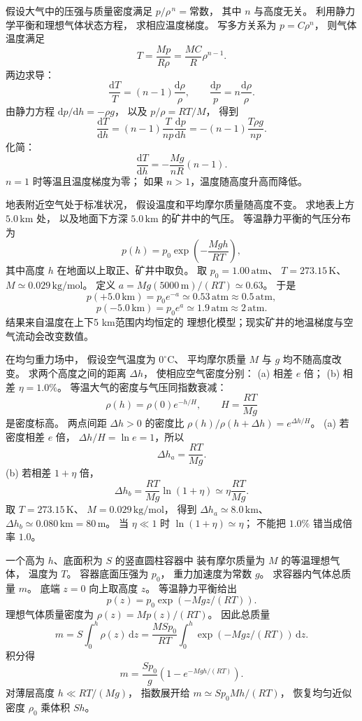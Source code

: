 假设大气中的压强与质量密度满足
$p/\rho^{\,n}=\text{常数}$，
其中 $n$ 与高度无关。
利用静力学平衡和理想气体状态方程，
求相应温度梯度。
\exsolution
写多方关系为 $p=C\rho^n$，
则气体温度满足
\[
T=\frac{Mp}{R\rho}
=\frac{MC}{R}\rho^{n-1}.
\]
两边求导：
\[
\frac{\mathrm dT}{T}
=(n-1)\frac{\mathrm d\rho}{\rho},
\qquad
\frac{\mathrm dp}{p}=n\frac{\mathrm d\rho}{\rho}.
\]
由静力方程
$\mathrm dp/\mathrm dh=-\rho g$，
以及 $p/\rho=RT/M$，
得到
\[
\frac{\mathrm dT}{\mathrm dh}
=(n-1)\frac{T}{n p}\frac{\mathrm dp}{\mathrm dh}
=-(n-1)\frac{T\rho g}{np}.
\]
化简：
\[
\boxed{\frac{\mathrm dT}{\mathrm dh}
=-\frac{Mg}{nR}(n-1)}.
\]
\excheck $n=1$ 时等温且温度梯度为零；
如果 $n>1$，温度随高度升高而降低。

地表附近空气处于标准状况，
假设温度和平均摩尔质量随高度不变。
求地表上方 $5.0\,\mathrm{km}$ 处，
以及地面下方深 $5.0\,\mathrm{km}$ 的矿井中的气压。
\exsolution
等温静力平衡的气压分布为
\[
p(h)=p_0\exp\left(-\frac{Mgh}{RT}\right),
\]
其中高度 $h$ 在地面以上取正、矿井中取负。
取 $p_0=1.00\,\mathrm{atm}$、
$T=273.15\,\mathrm K$、
$M\simeq0.029\,\mathrm{kg/mol}$。
定义
$a=M g(5000\,\mathrm m)/(RT)\simeq0.63$。
于是
\[
\boxed{p(+5.0\,\mathrm{km})
=p_0e^{-a}\simeq0.53\,\mathrm{atm}\approx0.5\,\mathrm{atm}},
\]
\[
\boxed{p(-5.0\,\mathrm{km})
=p_0e^{a}\simeq1.9\,\mathrm{atm}\approx2\,\mathrm{atm}}.
\]
\excheck 结果来自温度在上下5 km范围内均恒定的
理想化模型；现实矿井的地温梯度与空气流动会改变数值。

在均匀重力场中，
假设空气温度为 $0^\circ\mathrm C$、
平均摩尔质量 $M$ 与 $g$ 均不随高度改变。
求两个高度之间的距离 $\Delta h$，
使相应空气密度分别：
(a) 相差 $e$ 倍；
(b) 相差 $\eta=1.0\%$。
\exsolution
等温大气的密度与气压同指数衰减：
\[
\rho(h)=\rho(0)e^{-h/H},
\qquad H=\frac{RT}{Mg}
\]
是密度标高。
两点间距 $\Delta h>0$ 的密度比
$\rho(h)/\rho(h+\Delta h)=e^{\Delta h/H}$。
(a) 若密度相差 $e$ 倍，
$\Delta h/H=\ln e=1$，所以
\[
\boxed{\Delta h_a=\frac{RT}{Mg}}.
\]
(b) 若相差 $1+\eta$ 倍，
\[
\boxed{\Delta h_b=\frac{RT}{Mg}\ln(1+\eta)
\simeq\eta\frac{RT}{Mg}}.
\]
取 $T=273.15\,\mathrm K$、
$M=0.029\,\mathrm{kg/mol}$，
得到
$\boxed{\Delta h_a\simeq8.0\,\mathrm{km}}$、
$\boxed{\Delta h_b\simeq0.080\,\mathrm{km}=80\,\mathrm m}$。
\excheck 当 $\eta\ll1$ 时
$\ln(1+\eta)\simeq\eta$；
不能把 $1.0\%$ 错当成倍率 $1.0$。

一个高为 $h$、底面积为 $S$ 的竖直圆柱容器中
装有摩尔质量为 $M$ 的等温理想气体，
温度为 $T$。
容器底面压强为 $p_0$，
重力加速度为常数 $g$。
求容器内气体总质量 $m$。
\exsolution
底端 $z=0$ 向上取高度 $z$。
等温静力平衡给出
\[
p(z)=p_0\exp(-Mg z/(RT)).
\]
理想气体质量密度为
$\rho(z)=Mp(z)/(RT)$。
因此总质量
\[
m=S\int_0^h\rho(z)\,\mathrm dz
=\frac{MS p_0}{RT}
\int_0^h\exp(-Mg z/(RT))\,\mathrm dz.
\]
积分得
\[
\boxed{m=\frac{S p_0}{g}
\left(1-e^{-Mgh/(RT)}\right)}.
\]
\excheck 对薄层高度 $h\ll RT/(Mg)$，
指数展开给
$m\simeq S p_0 M h/(RT)$，
恢复均匀近似密度 $\rho_0$ 乘体积 $Sh$。

